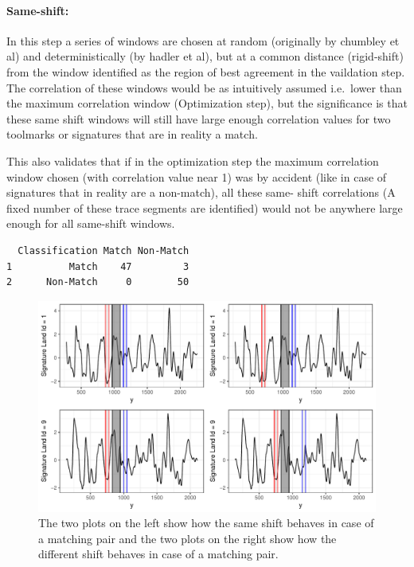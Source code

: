 \documentclass[12pt]{article}
\begin{document}
\paragraph{Same-shift:}\label{same-shift}

In this step a series of windows are chosen at random (originally by
chumbley et al) and deterministically (by hadler et al), but at a common
distance (rigid-shift) from the window identified as the region of best
agreement in the vaildation step. The correlation of these windows would
be as intuitively assumed i.e.~lower than the maximum correlation window
(Optimization step), but the significance is that these same shift
windows will still have large enough correlation values for two
toolmarks or signatures that are in reality a match.

This also validates that if in the optimization step the maximum
correlation window chosen (with correlation value near 1) was by
accident (like in case of signatures that in reality are a non-match),
all these same- shift correlations (A fixed number of these trace
segments are identified) would not be anywhere large enough for all
same-shift windows.

\begin{verbatim}
  Classification Match Non-Match
1          Match    47         3
2      Non-Match     0        50
\end{verbatim}

\begin{figure}

{\centering \includegraphics[width=\textwidth]{figures/win-comparison-1} 

}

\caption{ The two plots on the left show how the same shift behaves in case of a matching pair and the two plots on the right show how the different shift behaves in case of a matching pair.}\label{fig:win-comparison}
\end{figure}
\end{document}
